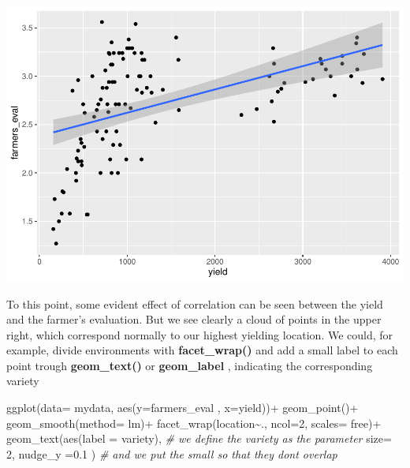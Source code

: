 \documentclass[
]{book}
\newenvironment{Shaded}{\begin{snugshade}}{\end{snugshade}}
\newcommand{\AttributeTok}[1]{\textcolor[rgb]{0.77,0.63,0.00}{#1}}
\newcommand{\CommentTok}[1]{\textcolor[rgb]{0.56,0.35,0.01}{\textit{#1}}}
\newcommand{\DecValTok}[1]{\textcolor[rgb]{0.00,0.00,0.81}{#1}}
\newcommand{\FloatTok}[1]{\textcolor[rgb]{0.00,0.00,0.81}{#1}}
\newcommand{\FunctionTok}[1]{\textcolor[rgb]{0.00,0.00,0.00}{#1}}
\newcommand{\NormalTok}[1]{#1}
\newcommand{\SpecialCharTok}[1]{\textcolor[rgb]{0.00,0.00,0.00}{#1}}
\newcommand{\StringTok}[1]{\textcolor[rgb]{0.31,0.60,0.02}{#1}}
\begin{document}
\includegraphics{PPB-Toolkit-for-R-and-R-Studio_files/figure-latex/unnamed-chunk-70-1.pdf}

To this point, some evident effect of correlation can be seen between the yield and the farmer's evaluation. But we see clearly a cloud of points in the upper right, which correspond normally to our highest yielding location. We could, for example, divide environments with \textbf{facet\_wrap() } and add a small label to each point trough \textbf{geom\_text() } or \textbf{geom\_label} , indicating the corresponding variety

\begin{Shaded}
\begin{Highlighting}[]
\FunctionTok{ggplot}\NormalTok{(}\AttributeTok{data=}\NormalTok{ mydata, }\FunctionTok{aes}\NormalTok{(}\AttributeTok{y=}\NormalTok{farmers\_eval ,  }\AttributeTok{x=}\NormalTok{yield))}\SpecialCharTok{+}
                   \FunctionTok{geom\_point}\NormalTok{()}\SpecialCharTok{+}
                   \FunctionTok{geom\_smooth}\NormalTok{(}\AttributeTok{method=}\NormalTok{ lm)}\SpecialCharTok{+}           
                   \FunctionTok{facet\_wrap}\NormalTok{(location}\SpecialCharTok{\textasciitilde{}}\NormalTok{., }\AttributeTok{ncol=}\DecValTok{2}\NormalTok{, }\AttributeTok{scales=} \StringTok{\textquotesingle{}free\textquotesingle{}}\NormalTok{)}\SpecialCharTok{+}
                   \FunctionTok{geom\_text}\NormalTok{(}\FunctionTok{aes}\NormalTok{(}\AttributeTok{label =}\NormalTok{ variety),    }\CommentTok{\# we define the variety as the parameter}
                              \AttributeTok{size=} \DecValTok{2}\NormalTok{,}
                             \AttributeTok{nudge\_y =}\FloatTok{0.1}\NormalTok{ )                  }\CommentTok{\# and we put the small so that they don\textquotesingle{}t overlap }
\end{Highlighting}
\end{Shaded}
\end{document}
